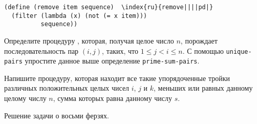 \begin{Verbatim}[fontsize=\small]
(define (remove item sequence)  \index{ru}{remove||||pd|}
  (filter (lambda (x) (not (= x item)))
          sequence))
\end{Verbatim}

\begin{exercise}{2.40}\label{EX2.40}%
Определите процедуру ,
которая, получая целое число $n$, порождает
последовательность пар $(i, j)$, таких, что $1 \le j
< i \le n$.  С помощью {\tt unique-pairs} упростите
данное выше определение {\tt prime-sum-pairs}.
\end{exercise}

\begin{exercise}{2.41}\label{EX2.41}%
Напишите процедуру, которая находит все такие упорядоченные
тройки различных положительных целых чисел $i$, $j$ и
$k$, меньших или равных данному целому числу
$n$, сумма которых равна данному числу $s$.
\end{exercise}

\begin{cntrfig}

\caption{Решение задачи о восьми ферзях.}
\label{P2.8}
\end{cntrfig}


